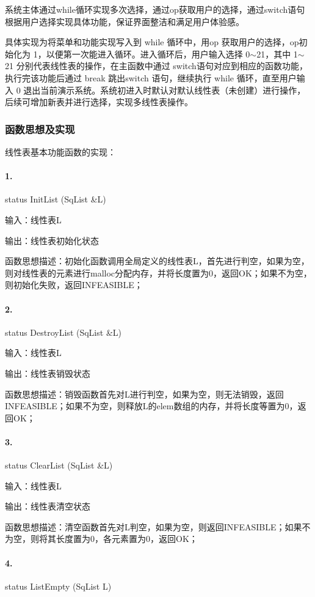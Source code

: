 \documentclass[supercite]{Experimental_Report}
\theoremstyle{definition}
\begin{document}
系统主体通过while循环实现多次选择，通过op获取用户的选择，通过switch语句根据用户选择实现具体功能，保证界面整洁和满足用户体验感。

具体实现为将菜单和功能实现写入到 while 循环中，用op 获取用户的选择，op初始化为 1，以便第一次能进入循环。进入循环后，用户输入选择 0$\sim$21，其中 1$\sim$21 分别代表线性表的操作，在主函数中通过 switch语句对应到相应的函数功能，执行完该功能后通过 break 跳出switch 语句，继续执行 while 循环，直至用户输入 0 退出当前演示系统。系统初进入时默认对默认线性表（未创建）进行操作，后续可增加新表并进行选择，实现多线性表操作。

\subsubsection{函数思想及实现}

线性表基本功能函数的实现：

\paragraph{ 1.} status InitList (SqList \&L) 

输入：线性表L

输出：线性表初始化状态

函数思想描述：初始化函数调用全局定义的线性表L，首先进行判空，如果为空，则对线性表的元素进行malloc分配内存，并将长度置为0，返回OK；如果不为空，则初始化失败，返回INFEASIBLE；

\paragraph{ 2.} status DestroyList (SqList \&L)

输入：线性表L

输出：线性表销毁状态

函数思想描述：销毁函数首先对L进行判空，如果为空，则无法销毁，返回INFEASIBLE；如果不为空，则释放L的elem数组的内存，并将长度等置为0，返回OK；

\paragraph{ 3.}status ClearList (SqList \&L)

输入：线性表L

输出：线性表清空状态

函数思想描述：清空函数首先对L判空，如果为空，则返回INFEASIBLE；如果不为空，则将其长度置为0，各元素置为0，返回OK；

\paragraph{ 4.}status ListEmpty (SqList L)
\end{document}
